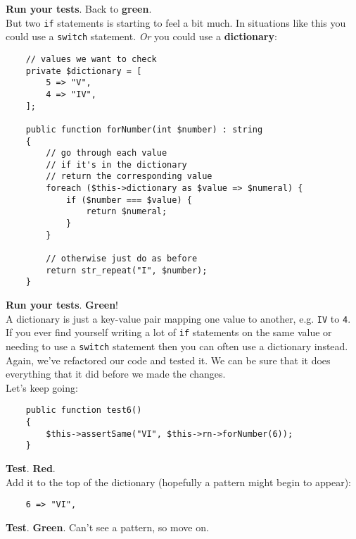 \textbf{Run your tests}. Back to \textbf{green}.
\\

But two \texttt{if} statements is starting to feel a bit much. In situations like this you could use a \texttt{switch} statement. \textit{Or} you could use a \textbf{dictionary}:

\begin{verbatim}
    // values we want to check
    private $dictionary = [
        5 => "V",
        4 => "IV",
    ];

    public function forNumber(int $number) : string
    {
        // go through each value
        // if it's in the dictionary
        // return the corresponding value
        foreach ($this->dictionary as $value => $numeral) {
            if ($number === $value) {
                return $numeral;
            }
        }

        // otherwise just do as before
        return str_repeat("I", $number);
    }
\end{verbatim}

\textbf{Run your tests}. \textbf{Green}!
\\

A dictionary is just a key-value pair mapping one value to another, e.g. \texttt{IV} to \texttt{4}. If you ever find yourself writing a lot of \texttt{if} statements on the same value or needing to use a \texttt{switch} statement then you can often use a dictionary instead.
\\

Again, we've refactored our code and tested it. We can be sure that it does everything that it did before we made the changes.
\\

Let's keep going:

\begin{verbatim}
    public function test6()
    {
        $this->assertSame("VI", $this->rn->forNumber(6));
    }
\end{verbatim}

\textbf{Test}. \textbf{Red}.
\\

Add it to the top of the dictionary (hopefully a pattern might begin to appear):

\begin{verbatim}
    6 => "VI",
\end{verbatim}

\textbf{Test}. \textbf{Green}. Can't see a pattern, so move on.

